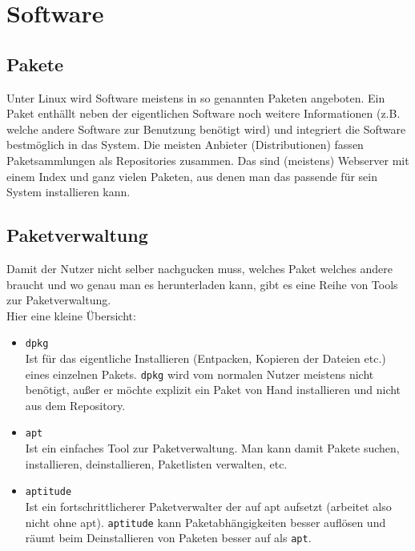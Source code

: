 \documentclass[a4paper,10pt]{article}
\begin{document}
\section{Software}
\subsection{Pakete}
Unter Linux wird Software meistens in so genannten Paketen angeboten. 
Ein Paket enthällt neben der eigentlichen Software noch weitere 
Informationen (z.B. welche andere Software zur Benutzung benötigt wird) 
und integriert die Software bestmöglich in das System. Die meisten 
Anbieter (Distributionen) fassen Paketsammlungen als Repositories zusammen. 
Das sind (meistens) Webserver mit einem Index und ganz vielen Paketen, 
aus denen man das passende für sein System installieren kann.

\subsection{Paketverwaltung}
Damit der Nutzer nicht selber nachgucken muss, welches Paket welches 
andere braucht und wo genau man es herunterladen kann, gibt es eine 
Reihe von Tools zur Paketverwaltung.\\
Hier eine kleine Übersicht:
\begin{itemize}
\item \texttt{dpkg} \\
Ist für das eigentliche Installieren (Entpacken, Kopieren der Dateien etc.) 
eines einzelnen Pakets. \texttt{dpkg} wird vom normalen Nutzer meistens 
nicht benötigt, außer er möchte explizit ein Paket von Hand installieren 
und nicht aus dem Repository.
\item \texttt{apt} \\ 
Ist ein einfaches Tool zur Paketverwaltung. Man kann damit Pakete suchen, 
installieren, deinstallieren, Paketlisten verwalten, etc.
\item \texttt{aptitude} \\ 
Ist ein fortschrittlicherer Paketverwalter der auf apt aufsetzt (arbeitet 
also nicht ohne apt). \texttt{aptitude} kann Paketabhängigkeiten besser 
auflösen und räumt beim Deinstallieren von Paketen besser auf als \texttt{apt}.
\end{itemize}
\end{document}
